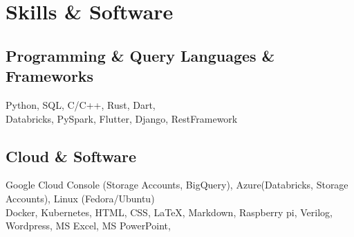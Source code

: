 \documentclass[]{m abbas resume' 2022}
\begin{document}
\begin{minipage}[t]{0.5\textwidth}
\begin{tightemize}
	\end{tightemize}


	\section{Skills \& Software}

	\subsection{Programming \& Query Languages \& Frameworks}
	Python, SQL, C/C++, Rust, Dart, \\
	Databricks, PySpark, Flutter, Django, RestFramework

	\subsection{Cloud \& Software}
	Google Cloud Console (Storage Accounts, BigQuery), Azure(Databricks, Storage Accounts), Linux (Fedora/Ubuntu) \\
	Docker, Kubernetes,
	HTML,
	CSS,
	LaTeX,
	Markdown,
	Raspberry pi,
	Verilog,
	Wordpress,
	MS Excel,
	MS PowerPoint,



\end{minipage}
\end{document}
